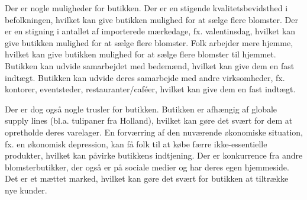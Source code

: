 Der er nogle muligheder for butikken. Der er en stigende kvalitetsbevidsthed i befolkningen, hvilket kan give butikken mulighed for at sælge flere blomster.
Der er en stigning i antallet af importerede mærkedage, fx. valentinsdag, hvilket kan give butikken mulighed for at sælge flere blomster.
Folk arbejder mere hjemme, hvilket kan give butikken mulighed for at sælge flere blomster til hjemmet.
Butikken kan udvide samarbejdet med bedemænd, hvilket kan give dem en fast indtægt.
Butikken kan udvide deres samarbejde med andre virksomheder, fx. kontorer, eventsteder, restauranter/caféer, hvilket kan give dem en fast indtægt.

Der er dog også nogle trusler for butikken. Butikken er afhængig af globale supply lines (bl.a. tulipaner fra Holland), hvilket kan gøre det svært for dem at opretholde deres varelager.
En forværring af den nuværende økonomiske situation, fx. en økonomisk depression, kan få folk til at købe færre ikke-essentielle produkter, hvilket kan påvirke butikkens indtjening.
Der er konkurrence fra andre blomsterbutikker, der også er på sociale medier og har deres egen hjemmeside.
Det er et mættet marked, hvilket kan gøre det svært for butikken at tiltrække nye kunder.

